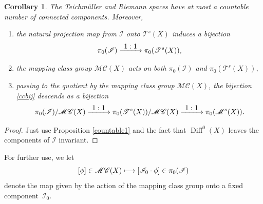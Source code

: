 \documentclass[10pt]{amsart}
\let\mathcal\mathscr
\def\mto{\mathchoice{\longmapsto}{\mapsto}{\mapsto}{\mapsto}}
\def\To#1{\mathchoice{\xrightarrow{\textstyle\kern4pt#1\kern3pt}}{\stackrel{#1}{\longrightarrow}}{}{}}
\DeclareMathOperator{\Diff}{Diff}
\theoremstyle{plain}
\newtheorem{corollary}[theorem]{Corollary}
\theoremstyle{definition}
\theoremstyle{remark}
\numberwithin{equation}{section}
\newcommand{\cI}{\mathcal{I}}
\begin{document}
\begin{corollary}
\label{countableTeich}
The Teichmüller and Riemann spaces have at most a countable number of connected components. Moreover,
\begin{enumerate}
\item
the natural projection map from $\cI$ onto $\mathcal T^s(X)$ induces a bijection
\begin{equation}
\label{ccbij}
\pi_0(\cI)\To{1:1}\pi_0(\mathcal T^s(X)),
\end{equation}
\item
the mapping class group $\mathcal M\mathcal C(X)$ acts on both $\pi_0(\cI)$ and $\pi_0(\mathcal T^s(X))$,
\item
passing to the quotient by the mapping class group $\mathcal M\mathcal C(X)$, the bijection \eqref{ccbij} descends as a bijection
\begin{equation}
\label{ccbij2}
\pi_0(\cI)/\mathcal M\mathcal C(X)\To{1:1}\pi_0(\mathcal T^s(X))/\mathcal M\mathcal C(X)\To{1:1}\pi_0(\mathcal M^s(X)).
\end{equation}
\end{enumerate}
\end{corollary}

\begin{proof}
Just use Proposition \ref{countable1} and the fact that $\Diff^0(X)$ leaves the components of $\cI$ invariant.
\end{proof}

For further use, we let
\begin{equation}
\label{mccc}
[\phi]\in\mathcal M\mathcal C(X)\mto [\cI_0\cdot \phi]\in\pi_0(\cI)
\end{equation}
denote the map given by the action of the mapping class group onto a fixed component~$\cI_0$.
\end{document}
